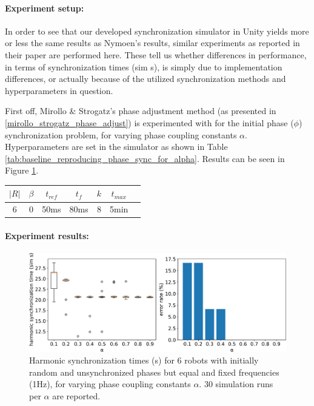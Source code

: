		\paragraph{Experiment setup:\nl}
		
		In order to see that our developed synchronization simulator in Unity yields more or less the same results as Nymoen's results, similar experiments as reported in their paper are performed here. These tell us whether differences in performance, in terms of synchronization times (sim s), is simply due to implementation differences, or actually because of the utilized synchronization methods and hyperparameters in question. 
		
		First off, Mirollo \& Strogatz's phase adjustment method (as presented in \ref{mirollo_strogatz_phase_adjust}) is experimented with for the initial phase ($\phi$) synchronization problem, for varying phase coupling constants $\alpha$. Hyperparameters are set in the simulator as shown in Table \ref{tab:baseline_reproducing_phase_sync_for_alpha}. Results can be seen in Figure \ref{fig:baseline_reproducing_phase_sync_for_alpha}.
		
		\begin{center}
		\begin{tabular}{ |c|c|c|c|c|c|c| } 
		\hline
		$|R|$ & $\beta$ & $t_{ref}$ & $t_f$ & $k$ & $t_{max}$ \\
		\hline
		6 & 0 & 50ms & 80ms & 8 & 5min \\
		\hline
		\end{tabular}
		\label{tab:baseline_reproducing_phase_sync_for_alpha}
		\end{center}
		
		\paragraph{Experiment results:\nl}
		
		\begin{figure}[ht!]
			\centering
			\includegraphics[width=\linewidth]{Assets/DocSegments/Chapters/ExperimentsAndResults/Figures/PerfScores/baseline_reproducing_phase_sync_for_alpha.pdf}
			\caption{Harmonic synchronization times (s) for 6 robots with initially random and unsynchronized phases but equal and fixed frequencies (1Hz), for varying phase coupling constants $\alpha$. 30 simulation runs per $\alpha$ are reported.}
			\label{fig:baseline_reproducing_phase_sync_for_alpha}
		\end{figure}
		
